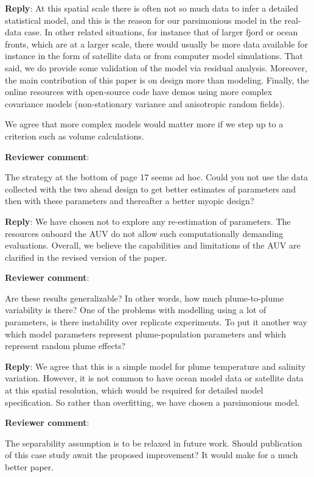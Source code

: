\documentclass[a4paper]{article}
\def\revcom{\textbf{Reviewer comment}}
\def\reply{\textbf{Reply}}
\begin{document}
\begin{answers}
\reply: At this spatial scale there is often not so much data to infer a detailed statistical model, and this is the reason for our parsimonious model in the real-data case. In other related situations, for instance that of larger fjord or ocean fronts, which are at a larger scale, there would usually be more data available for instance in the form of satellite data or from computer model simulations. 
That said, we do provide some validation of the model via residual analysis. Moreover, the main contribution of this paper is on design more than modeling. Finally, the online resources with open-source code have demos using more complex covariance models (non-stationary variance and anisotropic random fields). 

We agree that more complex models would matter more if we step up to a criterion such as volume calculations.   

\item{\revcom  :}\label{r1c10}

The strategy at the bottom of page 17 seems ad hoc. Could you not use the data collected with the two ahead design to get better estimates of parameters and then with these parameters and thereafter a better myopic design?

\reply: We have chosen not to explore any re-estimation of parameters. The resources onboard the AUV do not allow such computationally demanding evaluations. Overall, we believe the capabilities and limitations of the AUV are clarified in the revised version of the paper.

\item{\revcom :}\label{r1c11}

Are these results generalizable? In other words, how much plume-to-plume variability is there? One of the problems with modelling using a lot of parameters, is there instability over replicate experiments. To put it another way which model parameters represent plume-population parameters and which represent random plume effects?

\reply: We agree that this is a simple model for plume temperature and salinity variation. However, it is not common to have ocean model data or satellite data at this spatial resolution, which would be required for detailed model specification. So rather than overfitting, we have chosen a parsimonious model.

\item{\revcom :}\label{r1c12}

The separability assumption is to be relaxed in future work. Should publication of this case study await the proposed improvement? It would make for a much better paper.


\end{answers}
\end{document}
